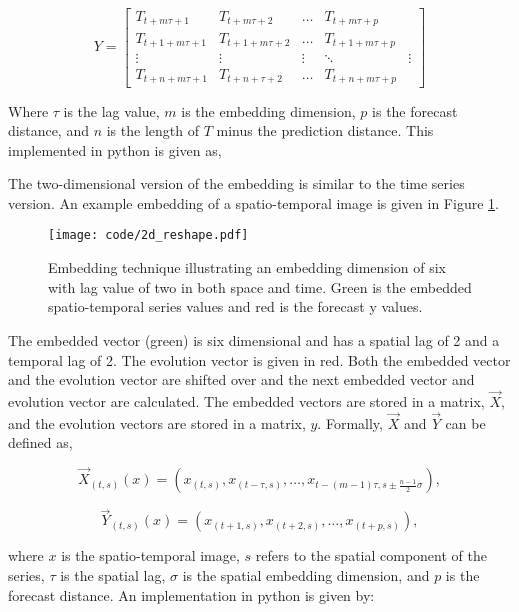 \[
Y=
\begin{bmatrix}
    T_{t+m\tau + 1} & T_{t+m\tau + 2}  & \dots  & T_{t+m\tau + p} \\
    T_{t+1 + m\tau + 1} & T_{t+1 + m\tau + 2}  & \dots  & T_{t+1 + m\tau + p} \\
    \vdots & \vdots & \vdots & \ddots & \vdots \\
    T_{t+n + m\tau + 1} & T_{t+n + \tau + 2}  & \dots  & T_{t+n +m\tau + p}
\end{bmatrix}
\]

Where $\tau$ is the lag value, $m$ is the embedding dimension, $p$ is the forecast distance, and $n$ is the length of $T$ minus the prediction distance. This implemented in python is given as,



The two-dimensional version of the embedding is similar to the time series version. An example embedding of a spatio-temporal image is given in Figure \ref{2d_embedding}. 

\begin{figure}[htbp] %
   \centering
   \texttt{[image: code/2d\_reshape.pdf]} 
   \caption{Embedding technique illustrating an embedding dimension of six with lag value of two in both space and time. Green is the embedded spatio-temporal series values and red is the forecast y values.}
   \label{2d_embedding}
\end{figure}


The embedded vector (green) is six dimensional and has a spatial lag of 2 and a temporal lag of 2. The evolution vector is given in red. Both the embedded vector and the evolution vector are shifted over and the next embedded vector and evolution vector are calculated. The embedded vectors are stored in a matrix, $\vec X$, and the evolution vectors are stored in a matrix, $y$. Formally, $\vec X$ and $\vec Y$ can be defined as,

$$\vec X_{(t,s)}(x) = (x_{(t,s)}, x_{(t-\tau,s)}, \dots, x_{t-(m-1)\tau,s\pm \frac{n-1}{2}\sigma}),$$

$$\vec Y_{(t,s)}(x) = (x_{(t+1,s)}, x_{(t+2,s)}, \dots, x_{(t+p,s)}   ),$$

where $x$ is the spatio-temporal image, $s$ refers to the spatial component of the series, $\tau$ is the spatial lag, $\sigma$ is the spatial embedding dimension, and $p$ is the forecast distance. An implementation in python is given by:

